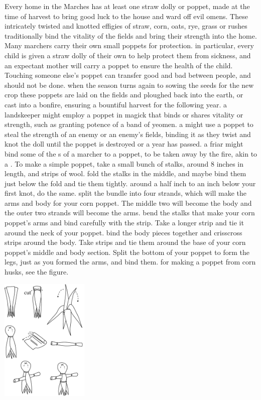  Every home in the Marches has at least one straw dolly or poppet, made at the time of harvest to bring good luck to the house and ward off evil omens. These intricately twisted and knotted effigies of straw, corn, oats, rye, grass or rushes traditionally bind the vitality of the fields and bring their strength into the home. \localpar Many marchers carry their own small poppets for protection. in particular, every child is given a straw dolly of their own to help protect them from sickness, and an expectant mother will carry a poppet to ensure the health of the child. Touching someone else’s poppet can transfer good and bad between people, and should not be done. when the season turns again to sowing the seeds for the new crop these poppets are laid on the fields and ploughed back into the earth, or cast into a bonfire, ensuring a bountiful harvest for the following year. a landskeeper might employ a poppet in magick that binds or shares vitality or strength, such as granting potence of a band of yeomen. a  might use a poppet to steal the strength of an enemy or an enemy's fields, binding it as they twist and knot the doll until the poppet is destroyed or a year has passed. a friar might bind some of the s of a marcher to a poppet, to be taken away by the  fire, akin to a . \localpar To make a simple poppet, take a small bunch of stalks, around 8 inches in length, and strips of wool. fold the stalks in the middle, and maybe bind them just below the fold and tie them tightly. around a half inch to an inch below your first knot, do the same. split the bundle into four strands, which will make the arms and body for your corn poppet. The middle two will become the body and the outer two strands will become the arms. bend the stalks that make your corn poppet’s arms and bind carefully with the strip. Take a longer strip and tie it around the neck of your poppet. bind the body pieces together and crisscross strips around the body. Take strips and tie them around the base of your corn poppet’s middle and body section. Split the bottom of your poppet to form the legs, just as you formed the arms, and bind them. for making a poppet from corn husks, see the figure.\begin{center}\includegraphics[width=4.2cm]{encyclopedia/poppet}\end{center} \bigparagraphendtwiddle
